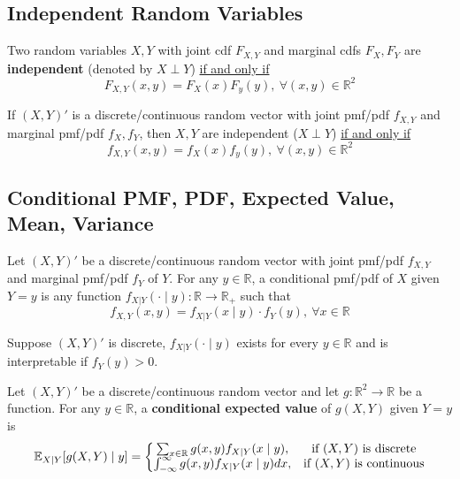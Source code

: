 \documentclass[11pt]{elegantbook}
\begin{document}
\subsection{Independent Random Variables}
\begin{definition}
    \normalfont
    Two random variables $X, Y$ with joint cdf $F_{X,Y}$ and marginal cdfs $F_X, F_Y$ are \textbf{independent} (denoted by $X\perp Y$) \underline{if and only if} $$F_{X,Y}(x,y)=F_X(x)F_y(y),\ \forall (x,y)\in \mathbb{R}^2$$
\end{definition}

\begin{proposition}
    If $(X,Y)'$ is a discrete/continuous random vector with joint pmf/pdf $f_{X,Y}$ and marginal pmf/pdf $f_X, f_Y$, then $X,Y$ are independent ($X\perp Y$) \underline{if and only if}
    $$f_{X,Y}(x,y)=f_X(x)f_y(y),\ \forall (x,y)\in \mathbb{R}^2$$
\end{proposition}


\subsection{Conditional PMF, PDF, Expected Value, Mean, Variance}
\begin{definition}
    \normalfont
    Let $(X,Y)'$ be a discrete/continuous random vector with joint pmf/pdf $f_{X,Y}$ and marginal pmf/pdf $f_Y$ of $Y$. For any $y\in \mathbb{R}$, a conditional pmf/pdf of $X$ given $Y=y$ is any function $f_{X|Y}(\cdot\mid y): \mathbb{R} \rightarrow \mathbb{R}_+$ such that $$f_{X,Y}(x,y)=f_{X|Y}(x\mid y)\cdot f_Y(y),\ \forall x\in \mathbb{R}$$
\end{definition}

\begin{proposition}
    Suppose $(X,Y)'$ is discrete, $f_{X|Y}(\cdot\mid y)$ exists for every $y\in \mathbb{R}$ and is interpretable if $f_Y(y)>0$.
\end{proposition}

\begin{definition}
    \normalfont
    Let $(X,Y)'$ be a discrete/continuous random vector and let $g: \mathbb{R}^2 \rightarrow \mathbb{R}$ be a function. For any $y\in \mathbb{R}$, a \textbf{conditional expected value} of $g(X,Y)$ given $Y=y$ is
    \begin{equation}
        \begin{aligned}
            \mathbb{E}_{X|Y}[g(X,Y)\mid y]=\left\{\begin{matrix}
                \sum_{x\in \mathbb{R}}g(x,y)f_{X|Y}(x\mid y),& \textnormal{if $(X,Y)$ is discrete}\\
                \int_{-\infty}^\infty g(x,y)f_{X|Y}(x\mid y) dx,& \textnormal{if $(X,Y)$ is continuous}
            \end{matrix}\right.
        \end{aligned}
        \nonumber
    \end{equation}
\end{definition}
\end{document}
